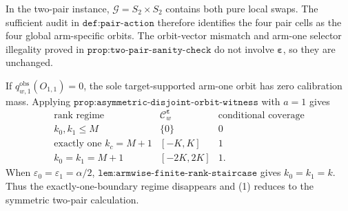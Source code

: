 In the two-pair instance, \(\mathcal G=S_2\times S_2\) contains both pure local swaps. The sufficient audit in \(\texttt{def:pair-action}\) therefore identifies the four pair cells as the four global arm-specific orbits. The orbit-vector mismatch and arm-one selector illegality proved in \(\texttt{prop:two-pair-sanity-check}\) do not involve \(\boldsymbol\varepsilon\), so they are unchanged.

If \(q^{\mathrm{obs}}_{w,1}(O_{1,1})=0\), the sole target-supported arm-one orbit has zero calibration mass. Applying \(\texttt{prop:asymmetric-disjoint-orbit-witness}\) with \(a=1\) gives
\[
\begin{array}{c|c|c}
\text{rank regime}&\mathcal C^{\boldsymbol\varepsilon}_w&\text{conditional coverage}\\ \hline
k_0,k_1\le M&\{0\}&0\\
\text{exactly one }k_c=M+1&[-K,K]&1\\
k_0=k_1=M+1&[-2K,2K]&1.
\end{array}
\tag{1}
\]
When \(\varepsilon_0=\varepsilon_1=\alpha/2\), \(\texttt{lem:armwise-finite-rank-staircase}\) gives \(k_0=k_1=k\). Thus the exactly-one-boundary regime disappears and (1) reduces to the symmetric two-pair calculation.